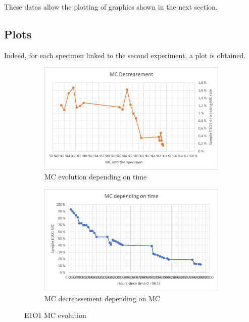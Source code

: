 These datas allow the plotting of graphics shown in the next section.
\subsection{Plots}
Indeed, for each specimen linked to the second experiment, a plot is obtained. 
 
\begin{figure}[th]
	\centering
	\begin{subfigure}{0.48\linewidth}
		\includegraphics[width=\textwidth]{Figures/E1O1_MCdecreas}
		\caption[Plot of the MC decreasement depending on time.]{MC evolution depending on time}
		\label{fig:Fig15_a}
	\end{subfigure}
	\hfill
	\begin{subfigure}{0.48\linewidth}
		\includegraphics[width=\textwidth]{Figures/E1O1_MCevol}
		\caption[MC decreassement depending on MC]{MC decreassement depending on MC}
		\label{fig:Fig15_b}
	\end{subfigure}
	\caption{E1O1 MC evolution}
	\label{fig:Fig15}
\end{figure}

